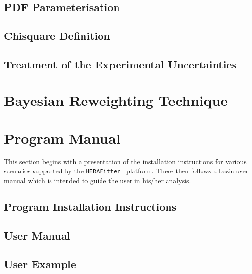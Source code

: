 \documentclass[11pt,twoside,a4paper]{article}
\newcommand\fitter{ \mbox{\tt HERAFitter} }
\begin{document}
\subsection{PDF Parameterisation}


\subsection{Chisquare  Definition}


\subsection{Treatment of the Experimental Uncertainties}
\label{sec:error}


\section{Bayesian Reweighting Technique}
\label{sec:reweighting}
 



\newpage
\section{Program Manual}
\label{sec:progman}
This section begins with a presentation of the installation instructions for various scenarios supported by the \fitter\ platform.
There then follows a basic user manual which is intended to guide the user in his/her analysis.

\subsection{Program Installation Instructions} 

\subsection{User Manual}

\subsection{User Example}



\appendix
%
\end{document}
